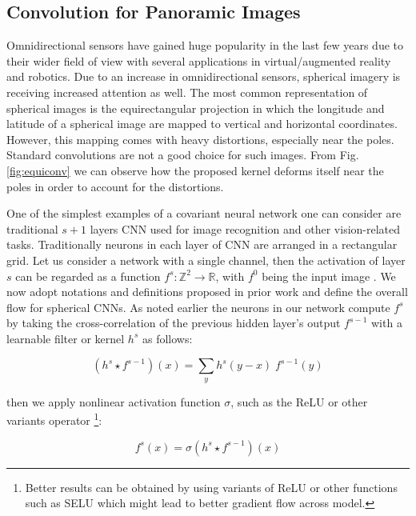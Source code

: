 \documentclass[final]{cvpr}
\newcommand{\nnl}{s}
\newcommand{\fell}{f^{\nnl}}
\newcommand{\fellm}{f^{\nnl-1}}
\newcommand{\chiell}{h^{\nnl}}
\begin{document}
\subsection{Convolution for Panoramic Images}
\label{subsec:sphereconv}
Omnidirectional sensors have gained huge popularity in the last few years due to their wider field of view with several applications in virtual/augmented reality and robotics. Due to an increase in omnidirectional sensors, spherical imagery is receiving increased attention as well. The most common representation of spherical images is the equirectangular projection in which the longitude and latitude of a spherical image are mapped to vertical and horizontal coordinates. However, this mapping comes with heavy distortions, especially near the poles. Standard convolutions are not a good choice for such images. From Fig. \ref{fig:equiconv} we can observe how the proposed kernel deforms itself near the poles in order to account for the distortions.





One of the simplest examples of a covariant neural network one can consider are traditional $s+1$ layers CNN used for image recognition and other vision-related tasks.  
Traditionally neurons in each layer of CNN are arranged in a rectangular grid. Let us consider a network with a single channel, then the activation of layer ${s}$ can be regarded as a function 
${\fell\colon \mathbb{Z}^2 \to \mathbb{R}}$, with ${f^0}$ being the input image \cite{cohen2018spherical,kondor2018clebschgordan}. We now adopt notations and definitions proposed in prior work \cite{kondor2018clebschgordan} and define the overall flow for spherical CNNs. 
As noted earlier the neurons in our network compute ${\fell}$ by taking the cross-correlation
of the previous hidden layer's output ${\fellm}$ with a learnable filter or kernel ${\chiell}$ as follows:

\begin{equation}\label{eq: xcorr1}
(\chiell \star \fellm)(x)=
\sum_{y} \chiell(y - x)\;\fellm(y)
\end{equation}

then we apply nonlinear activation function $\sigma$, such as the ReLU or other variants operator \footnote{Better results can be obtained by using variants of ReLU or other functions such as SELU which might lead to better gradient flow across model.}:

\begin{equation}\label{eq: CNN1}
\fell(x)=\sigma(\chiell \star \fellm)(x)
\end{equation}\newline
\end{document}
